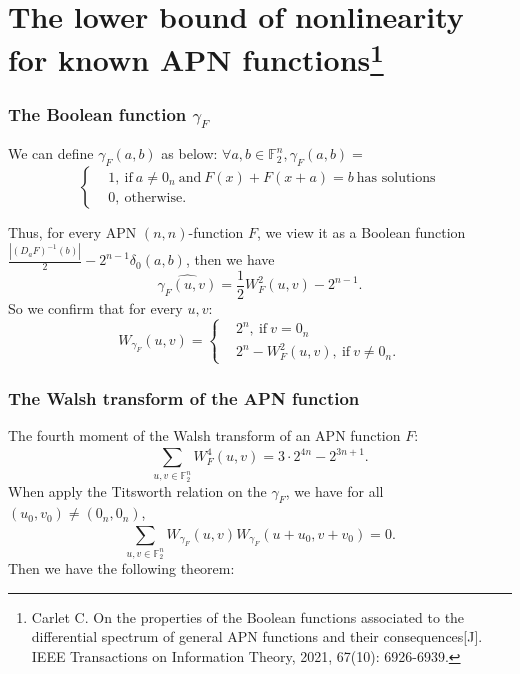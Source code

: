 \documentclass[
    aspectratio=169,                   %
]{beamer}
\newcommand{\F}{\mathbb{F}}
\begin{document}
\section{The lower bound of nonlinearity for known APN functions\footnote{Carlet C. On the properties of the Boolean functions associated to the differential spectrum of general APN functions and their consequences[J]. IEEE Transactions on Information Theory, 2021, 67(10): 6926-6939.}}
    \begin{frame}
        \frametitle{The Boolean function $ \gamma_F $}
    
        We can define $ \gamma_F(a,b) $ as below:
        $ \forall a,b\in\F_2^n,\gamma_F(a,b)= $
        \[\left\{\begin{aligned}        
            &1, ~\text{if} ~a\neq 0_n~\text{and}~ F(x)+F(x+a)=b ~\text{has~solutions}\\
            &0, ~\text{otherwise}.
        \end{aligned}\right.\]

        Thus, for every APN $ (n,n) $-function $ F $, we view it as a Boolean function
        $ \frac{|(D_aF)^{-1}(b)|}{2}-2^{n-1}\delta_0(a,b) $, then we have 
        \[\widehat{\gamma_F(u,v)}=\frac{1}{2}W_F^2(u,v)-2^{n-1}.\]
        So we confirm that for every $ u,v $:
        \[W_{\gamma_F}(u,v)=\left\{\begin{aligned}
            &2^n, ~\text{if}~ v=0_n\\
            &2^n-W_F^2(u,v), ~\text{if}~ v\neq 0_n.
        \end{aligned}\right.\]
        
    \end{frame}   

    \begin{frame}
        \frametitle{The Walsh transform of the APN function}
    
        The fourth moment of the Walsh transform of an APN function $ F $:
        \[\sum_{u,v\in\F_2^n}^{}W_F^4(u,v)=3\cdot 2^{4n}-2^{3n+1}.\]
        When apply the Titsworth relation on the $ \gamma_F $, we have for all $ (u_0,v_0)\neq(0_n,0_n) $,
        \[\sum_{u,v\in\F_2^n}^{}W_{\gamma_F}(u,v)W_{\gamma_F}(u+u_0,v+v_0)=0.\]
        Then we have the following theorem:
        
    
    \end{frame}
        
\end{document}
